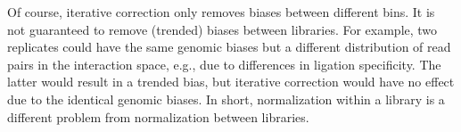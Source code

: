 \documentclass[12pt]{report}
\begin{document}
Of course, iterative correction only removes biases between different bins.
It is not guaranteed to remove (trended) biases between libraries.
For example, two replicates could have the same genomic biases but a different distribution of read pairs in the interaction space, e.g., due to differences in ligation specificity.
The latter would result in a trended bias, but iterative correction would have no effect due to the identical genomic biases.
In short, normalization within a library is a different problem from normalization between libraries.

% 
% 
\end{document}
